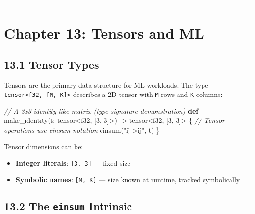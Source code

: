\documentclass[
  english,
]{book}
\newenvironment{Shaded}{\begin{snugshade}}{\end{snugshade}}
\newcommand{\CommentTok}[1]{\textcolor[rgb]{0.42,0.60,0.33}{\textit{#1}}}
\newcommand{\DataTypeTok}[1]{\textcolor[rgb]{0.31,0.79,0.69}{#1}}
\newcommand{\DecValTok}[1]{\textcolor[rgb]{0.71,0.81,0.66}{#1}}
\newcommand{\FunctionTok}[1]{\textcolor[rgb]{0.86,0.86,0.67}{#1}}
\newcommand{\KeywordTok}[1]{\textcolor[rgb]{0.34,0.61,0.84}{\textbf{#1}}}
\newcommand{\NormalTok}[1]{\textcolor[rgb]{0.83,0.83,0.83}{#1}}
\newcommand{\OperatorTok}[1]{\textcolor[rgb]{0.83,0.83,0.83}{#1}}
\newcommand{\StringTok}[1]{\textcolor[rgb]{0.81,0.57,0.47}{#1}}
\providecommand{\tightlist}{%
  \setlength{\itemsep}{0pt}\setlength{\parskip}{0pt}}
\begin{document}
\begin{center}\rule{0.5\linewidth}{0.5pt}\end{center}

\section{Chapter 13: Tensors and ML}\label{chapter-13-tensors-and-ml}

\subsection{13.1 Tensor Types}\label{tensor-types}

Tensors are the primary data structure for ML workloads. The type
\texttt{tensor\textless{}f32,\ {[}M,\ K{]}\textgreater{}} describes a 2D
tensor with \texttt{M} rows and \texttt{K} columns:

\begin{Shaded}
\begin{Highlighting}[]
\CommentTok{// A 3x3 identity{-}like matrix (type signature demonstration)}
\KeywordTok{def}\NormalTok{ make\_identity(t: }\DataTypeTok{tensor}\OperatorTok{\textless{}}\DataTypeTok{f32}\NormalTok{, [}\DecValTok{3}\NormalTok{, }\DecValTok{3}\NormalTok{]}\OperatorTok{\textgreater{}}\NormalTok{) }\OperatorTok{{-}\textgreater{}} \DataTypeTok{tensor}\OperatorTok{\textless{}}\DataTypeTok{f32}\NormalTok{, [}\DecValTok{3}\NormalTok{, }\DecValTok{3}\NormalTok{]}\OperatorTok{\textgreater{}}\NormalTok{ \{}
    \CommentTok{// Tensor operations use einsum notation}
    \FunctionTok{einsum}\NormalTok{(}\StringTok{"ij{-}\textgreater{}ij"}\NormalTok{, t)}
\NormalTok{\}}
\end{Highlighting}
\end{Shaded}

Tensor dimensions can be:

\begin{itemize}
\tightlist
\item
  \textbf{Integer literals}: \texttt{{[}3,\ 3{]}} --- fixed size
\item
  \textbf{Symbolic names}: \texttt{{[}M,\ K{]}} --- size known at
  runtime, tracked symbolically
\end{itemize}

\subsection{\texorpdfstring{13.2 The \texttt{einsum}
Intrinsic}{13.2 The einsum Intrinsic}}\label{the-einsum-intrinsic}
\end{document}
